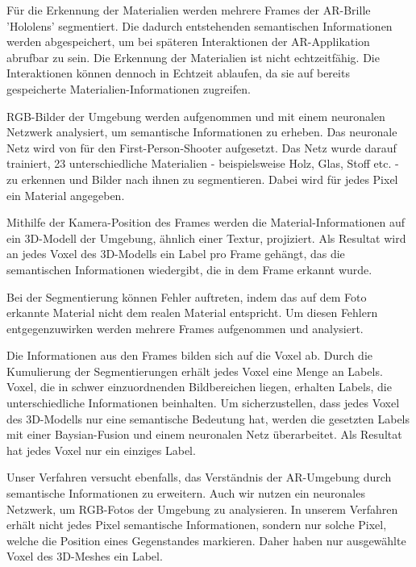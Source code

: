 Für die Erkennung der Materialien werden mehrere Frames der AR-Brille 'Hololens' segmentiert. Die dadurch entstehenden semantischen Informationen werden abgespeichert, um bei späteren Interaktionen der AR-Applikation abrufbar zu sein. Die Erkennung der Materialien ist nicht echtzeitfähig. Die Interaktionen können dennoch in Echtzeit ablaufen, da sie auf bereits gespeicherte Materialien-Informationen zugreifen. 

RGB-Bilder der Umgebung werden aufgenommen und mit einem neuronalen Netzwerk analysiert, um semantische Informationen zu erheben. Das neuronale Netz wird von \cite{contextawaremixedreality} für den First-Person-Shooter aufgesetzt. Das Netz wurde darauf trainiert, 23 unterschiedliche Materialien - beispielsweise Holz, Glas, Stoff etc. - zu erkennen und Bilder nach ihnen zu segmentieren. Dabei wird für jedes Pixel ein Material angegeben.

Mithilfe der Kamera-Position des Frames werden die Material-Informationen auf ein 3D-Modell der Umgebung, ähnlich einer Textur, projiziert. Als Resultat wird an jedes Voxel des 3D-Modells ein Label pro Frame gehängt, das die semantischen Informationen wiedergibt, die in dem Frame erkannt wurde.

Bei der Segmentierung können Fehler auftreten, indem das auf dem Foto erkannte Material nicht dem realen Material entspricht. Um diesen Fehlern entgegenzuwirken werden mehrere Frames aufgenommen und analysiert. %

Die Informationen aus den Frames bilden sich auf die Voxel ab. Durch die Kumulierung der Segmentierungen erhält jedes Voxel eine Menge an Labels. Voxel, die in schwer einzuordnenden Bildbereichen liegen, erhalten Labels, die unterschiedliche Informationen beinhalten. Um sicherzustellen, dass jedes Voxel des 3D-Modells nur eine semantische Bedeutung hat, werden die gesetzten Labels mit einer Baysian-Fusion und einem neuronalen Netz überarbeitet. Als Resultat hat jedes Voxel nur ein einziges Label.

Unser Verfahren versucht ebenfalls, das Verständnis der AR-Umgebung durch semantische Informationen zu erweitern. Auch wir nutzen ein neuronales Netzwerk, um RGB-Fotos der Umgebung zu analysieren.
In unserem Verfahren erhält nicht jedes Pixel semantische Informationen, sondern nur solche Pixel, welche die Position eines Gegenstandes markieren. Daher haben nur ausgewählte Voxel des 3D-Meshes ein Label.\citep{contextawaremixedreality}


